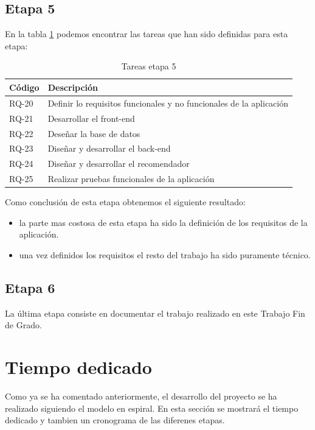 \subsection{Etapa 5}

En la tabla \ref{tabla:requisitosEtapa5} podemos encontrar las tareas que han sido definidas para esta etapa:

\begin{table}[H]
\begin{center}
\begin{tabular}{|p{1.5cm}| p{10.5cm}|}
\hline 
Código & Descripción \\
\hline \hline
RQ-20 & Definir lo requisitos funcionales y no funcionales de la aplicación\\ \hline
RQ-21 & Desarrollar el front-end\\ \hline
RQ-22 & Deseñar la base de datos\\ \hline
RQ-23 & Diseñar y desarrollar el back-end\\ \hline
RQ-24 & Diseñar y desarrollar el recomendador\\ \hline
RQ-25 & Realizar pruebas funcionales de la aplicación\\ \hline
\end{tabular}
\caption{Tareas etapa 5}
\label{tabla:requisitosEtapa5}
\end{center}
\end{table}

Como conclusión de esta etapa obtenemos el siguiente resultado:
\begin{itemize}
	\item la parte mas costosa de esta etapa ha sido la definición de los requisitos de la aplicación.
	\item una vez definidos los requisitos el resto del trabajo ha sido puramente técnico. 
\end{itemize}


\subsection{Etapa 6}

La última etapa consiste en documentar el trabajo realizado en este Trabajo Fin de Grado.

\newpage

\section{Tiempo dedicado}

Como ya se ha comentado anteriormente, el desarrollo del proyecto se ha realizado siguiendo el modelo en espiral. En esta sección se mostrará el tiempo dedicado y tambien un cronograma de las diferenes etapas.

